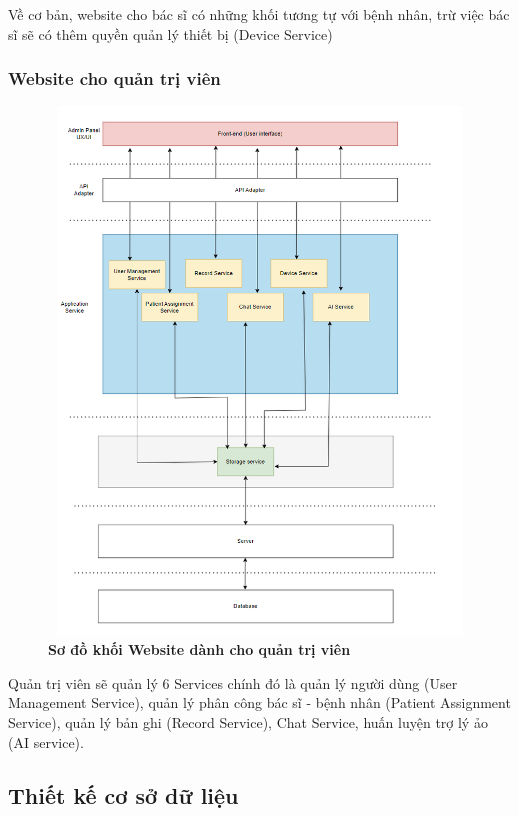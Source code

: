 Về cơ bản, website cho bác sĩ có những khối tương tự với bệnh nhân, trừ việc bác sĩ sẽ có thêm quyền quản lý thiết bị (Device Service)

\subsubsection{Website cho quản trị viên}

\begin{figure}[H]
  \centering
  \includegraphics[width=12cm,height=14cm]{Images/system/fmECG_architecture-Admin.drawio.png}
  \caption[Sơ đồ khối Website dành cho quản trị viên]{\bfseries \fontsize{12pt}{0pt}\selectfont Sơ đồ khối Website dành cho quản trị viên}
  \label{fmECG_architecture-Admin} %
\end{figure}

Quản trị viên sẽ quản lý 6 Services chính đó là quản lý người dùng (User Management Service), quản lý phân công
bác sĩ - bệnh nhân (Patient Assignment Service), quản lý bản ghi (Record Service), Chat Service, huấn luyện trợ lý ảo (AI service).
 
\newpage

\subsection{Thiết kế cơ sở dữ liệu}
\label{design_database}
